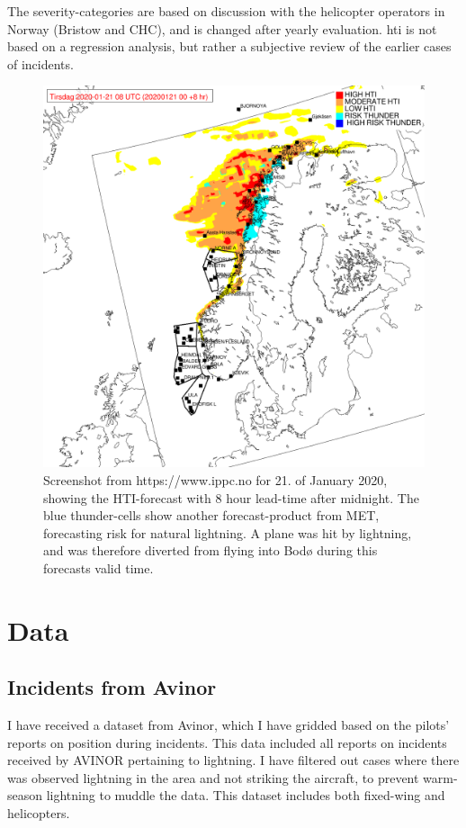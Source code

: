 The severity-categories are based on discussion with the helicopter operators in Norway (Bristow and CHC), and is changed after yearly evaluation. \acrshort{hti} is not based on a regression analysis, but rather a subjective review of the earlier cases of incidents.
\begin{figure}
    \centering
    \includegraphics[width=\textwidth]{Figures/hti.png}
    \caption{Screenshot from https://www.ippc.no for 21. of January 2020, showing the HTI-forecast with 8 hour lead-time after midnight. The blue thunder-cells show another forecast-product from MET, forecasting risk for natural lightning. A plane was hit by lightning, and was therefore diverted from flying into Bodø during this forecasts valid time. }
    \label{fig:hti}
\end{figure}
\section{Data}

\subsection{Incidents from Avinor}
I have received a dataset from Avinor, which I have gridded based on the pilots’ reports on position during incidents. This data included all reports on incidents received by AVINOR pertaining to lightning. I have filtered out cases where there was observed lightning in the area and not striking the aircraft, to prevent warm-season lightning to muddle the data. This dataset includes both fixed-wing and helicopters. 


